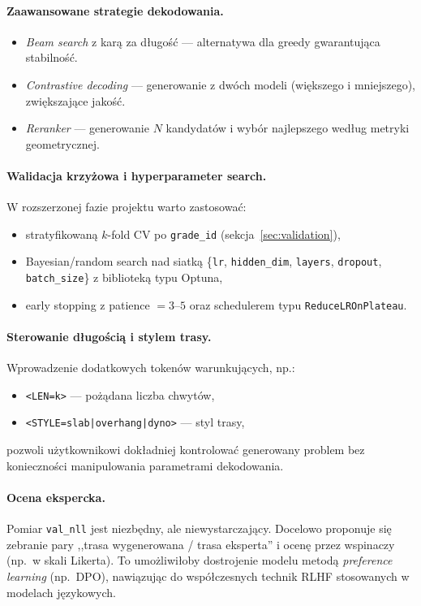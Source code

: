 \documentclass[12pt,a4paper]{article}
\begin{document}
\paragraph{Zaawansowane strategie dekodowania.}
\begin{itemize}[leftmargin=1.5em]
    \item \emph{Beam search} z karą za długość --- alternatywa dla greedy gwarantująca stabilność.
    \item \emph{Contrastive decoding} --- generowanie z dwóch modeli (większego i mniejszego), zwiększające jakość.
    \item \emph{Reranker} --- generowanie $N$ kandydatów i wybór najlepszego według metryki geometrycznej.
\end{itemize}

\paragraph{Walidacja krzyżowa i hyperparameter search.}
W rozszerzonej fazie projektu warto zastosować:
\begin{itemize}[leftmargin=1.5em]
    \item stratyfikowaną $k$-fold CV po \texttt{grade\_id} (sekcja~\ref{sec:validation}),
    \item Bayesian/random search nad siatką \{\texttt{lr}, \texttt{hidden\_dim}, \texttt{layers}, \texttt{dropout}, \texttt{batch\_size}\} z biblioteką typu Optuna,
    \item early stopping z patience $=3$--$5$ oraz schedulerem typu \texttt{ReduceLROnPlateau}.
\end{itemize}

\paragraph{Sterowanie długością i stylem trasy.}
Wprowadzenie dodatkowych tokenów warunkujących, np.:
\begin{itemize}[leftmargin=1.5em]
    \item \texttt{<LEN=k>} --- pożądana liczba chwytów,
    \item \texttt{<STYLE=slab|overhang|dyno>} --- styl trasy,
\end{itemize}
pozwoli użytkownikowi dokładniej kontrolować generowany problem bez konieczności manipulowania parametrami dekodowania.

\paragraph{Ocena ekspercka.}
Pomiar \texttt{val\_nll} jest niezbędny, ale niewystarczający. Docelowo proponuje się zebranie pary ,,trasa wygenerowana / trasa eksperta'' i ocenę przez wspinaczy (np.\ w skali Likerta). To umożliwiłoby dostrojenie modelu metodą \emph{preference learning} (np.\ DPO), nawiązując do współczesnych technik RLHF stosowanych w modelach językowych.


\end{document}
